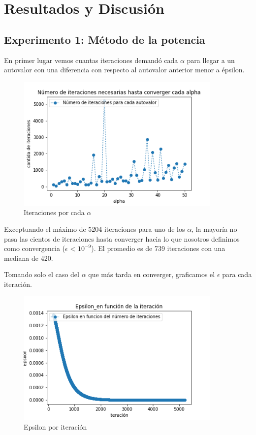 \section{Resultados y Discusión}

\subsection{Experimento 1: Método de la potencia}

En primer lugar vemos cuantas iteraciones demandó cada $\alpha$ para llegar a un autovalor con una diferencia con respecto al autovalor anterior menor a épsilon. \\

\begin{figure}[H]
     \begin{center}
     \includegraphics[width=100mm]{img/iteraciones_x_alpha.png} 
    \end{center}
\caption{Iteraciones por cada $\alpha$} \label{fig:exp1-iters}
\end{figure}

Exceptuando el máximo de 5204 iteraciones para uno de los $\alpha$, la mayoría no pasa las cientos de iteraciones hasta converger hacia lo que nosotros definimos como convergencia ($\epsilon$ < $10^{-9}$). 
El promedio es de 739 iteraciones con una mediana de 420.

Tomando solo el caso del $\alpha$ que más tarda en converger, graficamos el $\epsilon$ para cada iteración.\\

\begin{figure}[H]
     \begin{center}
     \includegraphics[width=100mm]{img/epsilon_x_iter.png} 
    \end{center}
\caption{Epsilon por iteración} \label{fig:exp1-epsilon}
\end{figure}

